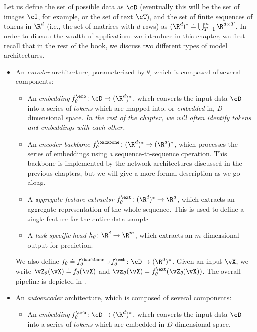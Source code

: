 \documentclass[../../book-main.tex]{subfiles}
\begin{document}
Let us define the set of possible data as \(\cD\) (eventually this will be the set of images \(\cI\), for example, or the set of text \(\cT\)), and the set of finite sequences of tokens in \(\R^{d}\) (i.e., the set of matrices with \(d\) rows) as \((\R^{d})^{*} \doteq \bigcup_{T = 1}^{\infty}\R^{d \times T}\). In order to discuss the wealth of applications we introduce in this chapter, we first recall that in the rest of the book, we discuss two different types of model architectures.
\begin{itemize}
    \item An \textit{encoder} architecture, parameterized by \(\theta\), which is composed of several components:
    \begin{itemize}
        \item An \textit{embedding} \(f_{\theta}^{\emb} \colon \cD \to (\R^{d})^{*}\), which converts the input data \(\cD\) into a series of \textit{tokens} which are mapped into, or \textit{embedded} in, \(D\)-dimensional space. \textit{In the rest of the chapter, we will often identify tokens and embeddings with each other.}
        \item An \textit{encoder backbone} \(f_{\theta}^{\backbone} \colon (\R^{d})^{*} \to (\R^{d})^{*}\), which processes the series of embeddings using a sequence-to-sequence operation. This backbone is implemented by the network architectures discussed in the previous chapters, but we will give a more formal description as we go along.
        \item A \textit{aggregate feature extractor} \(f_{\theta}^{\ext} \colon (\R^{d})^{*} \to \R^{d}\), which extracts an aggregate representation of the whole sequence. This is used to define a single feature for the entire data sample.
        \item A \textit{task-specific head} \(h_{\theta} \colon \R^{d} \to \R^{m}\), which extracts an \(m\)-dimensional output for prediction.
    \end{itemize}
    We also define \(f_{\theta} \doteq f_{\theta}^{\backbone} \circ f_{\theta}^{\emb} \colon \cD \to (\R^{d})^{*}\). Given an input \(\vX\), we write \(\vZ_{\theta}(\vX) \doteq f_{\theta}(\vX)\) and \(\vz_{\theta}(\vX) \doteq f_{\theta}^{\ext}(\vZ_{\theta}(\vX))\). The overall pipeline is depicted in .
    \item An \textit{autoencoder} architecture, which is composed of several components:
    \begin{itemize}
        \item An \textit{embedding} \(f_{\theta}^{\emb} \colon \cD \to (\R^{d})^{*}\), which converts the input data \(\cD\) into a series of \textit{tokens} which are embedded in \(D\)-dimensional space.

\end{itemize}
\end{itemize}
\end{document}
